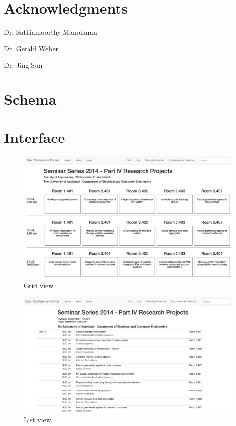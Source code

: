 \documentclass[conference]{IEEEtran}
\begin{document}
\section{Acknowledgments}
Dr. Sathiamoorthy Manoharan

Dr. Gerald Weber

Dr. Jing Sun




\onecolumn
\appendix
\section{Schema}


\section{Interface}
\begin{figure}[h]
  \centering
  \includegraphics[scale=0.4]{images/grid_view.png}
  \caption{Grid view}
  \label{fig:grid_view}
\end{figure}

\begin{figure}[h]
  \centering
  \includegraphics[scale=0.4]{images/list_view.png}
  \caption{List view}
  \label{fig:list_view}
\end{figure}
\end{document}
